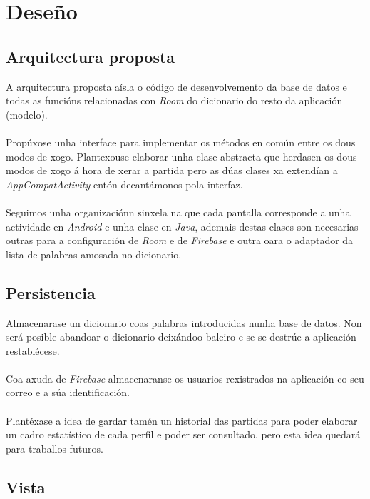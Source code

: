 \chapter{Deseño}
\label{chap:deseño}
\section {Arquitectura proposta}
A arquitectura proposta aísla o código de desenvolvemento da base de datos e todas as funcións relacionadas con \textit{Room} do dicionario do resto da aplicación (modelo).\\
\\
Propúxose unha interface para implementar os métodos en común entre os dous modos de xogo. Plantexouse elaborar unha clase abstracta que herdasen os dous modos de xogo á hora de xerar a partida pero as dúas clases xa extendían a \textit{AppCompatActivity} entón decantámonos pola interfaz.\\
\\
Seguimos unha organizaciónn sinxela na que cada pantalla corresponde a unha actividade en \textit{Android} e unha clase en \textit{Java}, ademais destas clases son necesarias outras para a configuración de \textit{Room} e de \textit{Firebase} e outra oara o adaptador da lista de palabras amosada no dicionario.


\section {Persistencia}
Almacenarase un dicionario coas palabras introducidas nunha base de datos. Non será posible abandoar o dicionario deixándoo baleiro e se se destrúe a aplicación restablécese. \\
\\
Coa axuda de \textit{Firebase} almacenaranse os usuarios rexistrados na aplicación co seu correo e a súa identificación. \\
\\
Plantéxase a idea de gardar tamén un historial das partidas para poder elaborar un cadro estatístico de cada perfil e poder ser consultado, pero esta idea quedará para traballos futuros.

\section {Vista}

